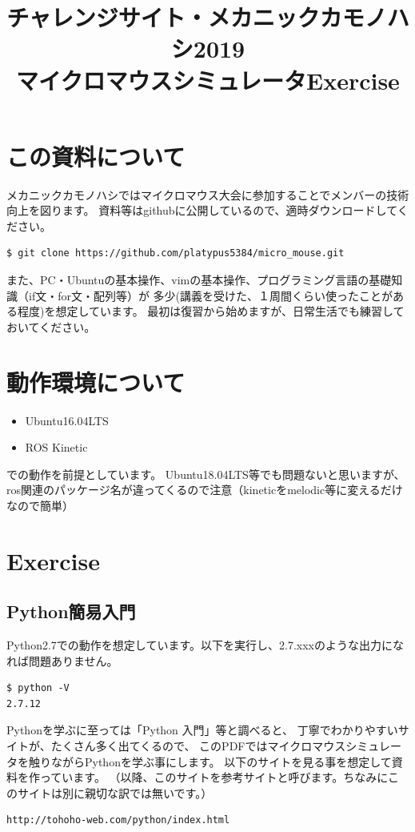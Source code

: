 \documentclass[11pt,a4paper]{jsarticle}
\title{チャレンジサイト・メカニックカモノハシ2019\\マイクロマウスシミュレータExercise}
\begin{document}
\maketitle
%
%
\section{この資料について}
メカニックカモノハシではマイクロマウス大会に参加することでメンバーの技術向上を図ります。
資料等はgithubに公開しているので、適時ダウンロードしてください。

\begin{lstlisting}[frame=single]
$ git clone https://github.com/platypus5384/micro_mouse.git
\end{lstlisting}

また、PC・Ubuntuの基本操作、vimの基本操作、プログラミング言語の基礎知識（if文・for文・配列等）が
多少(講義を受けた、１周間くらい使ったことがある程度)を想定しています。
最初は復習から始めますが、日常生活でも練習しておいてください。


\section{動作環境について}
\begin{itemize}
\item{} Ubuntu16.04LTS
\item{} ROS Kinetic
\end{itemize}

での動作を前提としています。
Ubuntu18.04LTS等でも問題ないと思いますが、ros関連のパッケージ名が違ってくるので注意（kineticをmelodic等に変えるだけなので簡単）


\section{Exercise}
\subsection{Python簡易入門}
Python2.7での動作を想定しています。以下を実行し、2.7.xxxのような出力になれば問題ありません。
\begin{lstlisting}[frame=single]
$ python -V
2.7.12
\end{lstlisting}

Pythonを学ぶに至っては「Python 入門」等と調べると、
丁寧でわかりやすいサイトが、たくさん多く出てくるので、
このPDFではマイクロマウスシミュレータを触りながらPythonを学ぶ事にします。
以下のサイトを見る事を想定して資料を作っています。
（以降、このサイトを参考サイトと呼びます。ちなみにこのサイトは別に親切な訳では無いです。）
\begin{lstlisting}[frame=single]
http://tohoho-web.com/python/index.html
\end{lstlisting}
\end{document}
